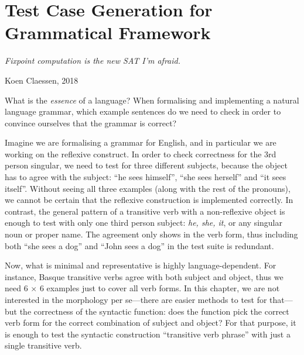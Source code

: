 \def\numOfLex{17}
\def\numOfFun{8}
\def\gray#1{{\color{gray}\char`<#1\char`>}}
\newcommand{\tts}[1]{{\tt #1}}

\chapter{Test Case Generation for Grammatical Framework}
\label{chapterGFtest}

\epigraph{\it Fixpoint computation is the new SAT I'm afraid.}{Koen
  Claessen, 2018}

\noindent What is the \emph{essence} of a language? When formalising
and implementing a natural language grammar, which example sentences
do we need to check in order to convince ourselves that the grammar is
correct? 

Imagine we are formalising a grammar for English, and in particular we
are working on the reflexive construct. In order to check correctness
for the 3rd person singular, we need to test for three different
subjects, because the object has to agree with the subject: ``he sees
himself'', ``she sees herself'' and ``it sees itself''. Without seeing
all three examples (along with the rest of the pronouns), we cannot be certain that the reflexive
construction is implemented correctly. In contrast, the general
pattern of a transitive verb with a non-reflexive object is enough to
test with only one third person subject: \emph{he, she, it}, or any
singular noun or proper name. The agreement only shows in the verb
form, thus including both ``she sees a dog'' and ``John sees a dog''
in the test suite is redundant.  

Now, what is minimal and representative is highly language-dependent. 
For instance, Basque transitive verbs agree with both subject and
object, thus we need 6 $\times$ 6 examples just to cover all verb
forms. In this chapter, we are not interested in the morphology per se---there are
easier methods to test for that---but the correctness of the syntactic
function: does the function pick the correct verb form for the correct
combination of subject and object? For that purpose, it is enough to
test the syntactic construction ``transitive verb phrase'' with just a
single transitive verb.

